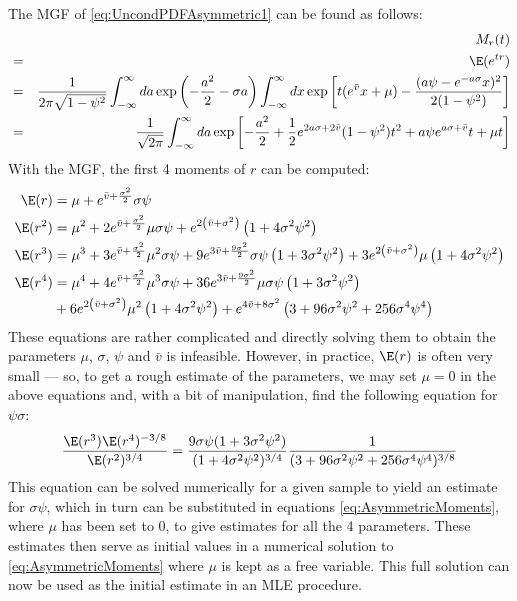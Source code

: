 The MGF of \ref{eq:UncondPDFAsymmetric1} can be found as follows:
\begin{eqnarray*}
  && M_{r}(t) \\
  &=& \E(e^{tr}) \\
  &=& {1 \over 2\pi \sqrt{1 - \psi^2}} \int_{-\infty}^{\infty} da \exp \left(
    -{a^2 \over 2} - \sigma a
  \right) \int_{-\infty}^{\infty} dx \exp\left[
    t(e^{\bar{v}}x + \mu) - {
      (a\psi - e^{-a \sigma} x)^2 \over 2 (1 - \psi^2)
    }
  \right] \\
  &=& {1 \over \sqrt{2 \pi}} \int_{-\infty}^{\infty} da \exp\left[
    -{a^2 \over 2} + {1 \over 2} e^{2 a \sigma + 2\bar{v}} (1 - \psi^2) t^2 +
    a \psi e^{a \sigma + \bar{v}} t + \mu t
  \right]
\end{eqnarray*}
With the MGF, the first 4 moments of $r$ can be computed:
\begin{equation}
  \label{eq:AsymmetricMoments}
  \begin{aligned}
    \E(r) &= \mu +e^{\bar{v}+\frac{\sigma ^2}{2}} \sigma  \psi\\
    \E(r^2) &= \mu ^2+2 e^{\bar{v}+\frac{\sigma ^2}{2}} \mu  \sigma  \psi
    +e^{2 \left(\bar{v}+\sigma ^2\right)} \left(1+4 \sigma ^2 \psi^2\right)\\
    \E(r^3) &= \mu ^3+3 e^{\bar{v}+\frac{\sigma ^2}{2}} \mu ^2 \sigma \psi
    +9 e^{3 \bar{v}+\frac{9 \sigma ^2}{2}} \sigma \psi \left(1+3 \sigma ^2
      \psi ^2\right)
    +3e^{2 \left(\bar{v}+\sigma ^2\right)} \mu  \left(1+4 \sigma ^2 \psi
      ^2\right) \\
    \E(r^4) &= \mu ^4+4 e^{\bar{v}+\frac{\sigma ^2}{2}} \mu ^3 \sigma  \psi
    +36 e^{3 \bar{v}+\frac{9 \sigma ^2}{2}} \mu  \sigma  \psi  \left(1+3
      \sigma ^2 \psi ^2\right)\\ 
    & +6 e^{2 \left(\bar{v}+\sigma ^2\right)} \mu ^2 \left(1+4 \sigma ^2 \psi
      ^2\right)
    +e^{4 \bar{v}+8 \sigma ^2} \left(3+96 \sigma ^2 \psi ^2+256 \sigma ^4
      \psi ^4\right)
  \end{aligned}
\end{equation}
These equations are rather complicated and directly solving them to
obtain the parameters $\mu$, $\sigma$, $\psi$ and $\bar{v}$ is
infeasible. However, in practice, $\E(r)$ is often very small --- so, to
get a rough estimate of the parameters, we may set $\mu = 0$ in the
above equations and, with a bit of manipulation, find the following
equation for $\psi\sigma$:
\begin{equation}
  \label{eq:moment1}
  {\E(r^3) \E(r^4)^{-3/8} \over \E(r^2)^{3/4}} =
  {9\sigma \psi (1 + 3\sigma^2\psi^2) \over (1 +
    4\sigma^2\psi^2)^{3/4}}
  {1
    \over
    (3 + 96\sigma^2\psi^2 + 256\sigma^4 \psi^4)^{3/8}
  }
\end{equation}
This equation can be solved numerically for a given sample to yield an
estimate for $\sigma\psi$, which in turn can be substituted in
equations \ref{eq:AsymmetricMoments}, where $\mu$ has been set to 0,
to give estimates for all the 4 parameters. These estimates then serve
as initial values in a numerical solution to
\ref{eq:AsymmetricMoments} where $\mu$ is kept as a free
variable. This full solution can now be used as the initial estimate
in an MLE procedure.

